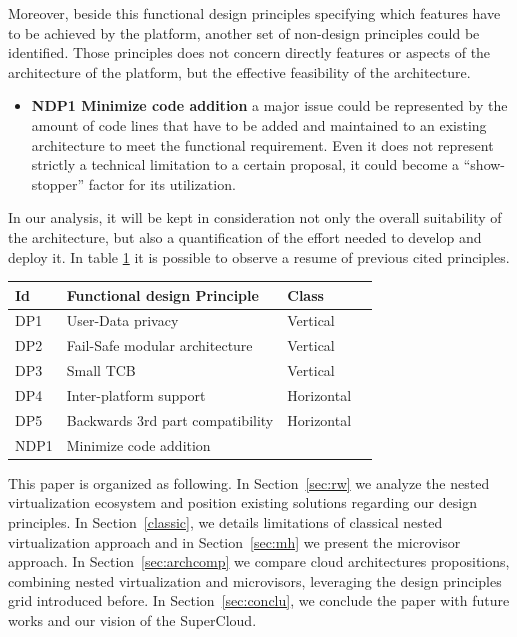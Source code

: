 \documentclass{sig-alternate}
\begin{document}
Moreover, beside this functional design principles specifying which features have to be achieved by the platform, another set of non-design principles could be identified. Those principles does not concern directly features or aspects of the architecture of the platform, but the effective feasibility of the architecture. 
\begin{itemize}[]
\item \textbf{NDP1 Minimize code addition} a major issue could be represented by the amount of code lines that have to be added and maintained to an existing architecture to meet the functional requirement. Even it does not represent strictly a technical limitation to a certain proposal, it could become a ``show-stopper'' factor for its utilization.
\end{itemize}
In our analysis, it will be kept in consideration not only the overall suitability of the architecture, but also a quantification of the effort needed to develop and deploy it. In table \ref{int:des} it is possible to observe a resume of previous cited principles.
 
\begin{table}
\label{int:des}
\begin{tabular}{llll}
\toprule
Id & Functional design Principle & Class &\\
\midrule
   DP1 & User-Data privacy & Vertical & \\
   DP2 & Fail-Safe modular architecture & Vertical & \\ 
   DP3 & Small TCB & Vertical & \\
   DP4 & Inter-platform support & Horizontal & \\
   DP5 & Backwards 3rd part compatibility & Horizontal \\
   NDP1 & Minimize code addition & & \\
\bottomrule
      \end{tabular}
\end{table}

This paper is organized as following. In Section~\ref{sec:rw} we analyze the nested virtualization ecosystem and position existing solutions regarding our design principles. In Section~\ref{classic}, we details limitations of classical nested virtualization approach and in Section~\ref{sec:mh} we present the microvisor approach. In Section~\ref{sec:archcomp} we compare cloud architectures propositions, combining nested virtualization and microvisors, leveraging the design principles grid introduced before.
In Section~\ref{sec:conclu}, we conclude the paper with future works and our vision of the SuperCloud.
 
\end{document}
